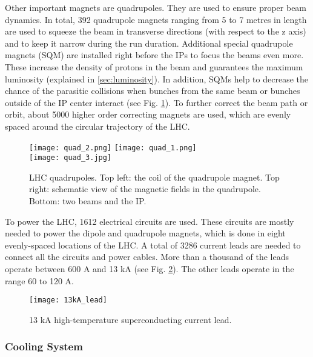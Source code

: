 \begin{normalsize}
Other important magnets are quadrupoles. They are used to ensure proper beam dynamics. In total, 392 quadrupole magnets ranging from 5 to 7 metres in length are used to squeeze the beam in transverse directions (with respect to the z axis) and to keep it narrow during the run duration. Additional special quadrupole magnets (SQM) are installed right before the IPs to focus the beams even more. These increase the density of protons in the beam and guarantees the maximum luminosity (explained in \ref{sec:luminosity}). In addition, SQMs help to decrease the chance of the parasitic collisions when bunches from the same beam or bunches outside of the IP center interact (see Fig. \ref{quadrupoles}). To further correct the beam path or orbit, about 5000 higher order correcting magnets are used, which are evenly spaced around the circular trajectory of the LHC. 


\begin{figure}[H]
\centering
\texttt{[image: quad\_2.png]}
\texttt{[image: quad\_1.png]}\\
\vspace{0.5cm}
\texttt{[image: quad\_3.jpg]}
\caption[LHC quadrupoles]{LHC quadrupoles. Top left: the coil of the quadrupole magnet. Top right: schematic view of the magnetic fields in the quadrupole. Bottom: two beams and the IP.}
\label{quadrupoles}
\end{figure}

To power the LHC, 1612 electrical circuits are used. These circuits are mostly needed to power the dipole and quadrupole magnets, which is done in eight evenly-spaced locations of the LHC. A total of 3286 current leads are needed to connect all the circuits and power cables. More than a thousand of the leads operate between 600 A and 13 kA (see Fig. \ref{13kA_lead}). The other leads operate in the range 60 to 120 A. 


\begin{figure}[H]
  \centering
  \texttt{[image: 13kA\_lead]}
  \caption{13 kA high-temperature superconducting current lead.}\label{13kA_lead}
\end{figure}



\subsubsection{Cooling System}\label{sec:cryogenic}


\end{normalsize}
